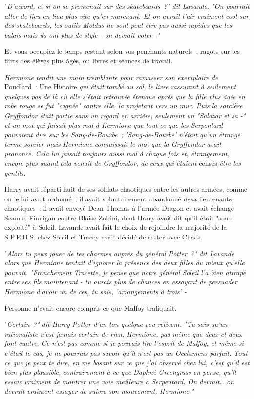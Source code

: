 "\emph{D'accord, et si on se promenait sur des skateboards~?" dit Lavande. "On pourrait aller de lieu en lieu plus vite qu'en marchant. Et on aurait l'air vraiment cool sur des skateboards, les outils Moldus ne sont peut-être pas aussi rapides que les balais mais ils ont plus de style - on devrait voter -"}

Et vous occupiez le temps restant selon vos penchants naturels~: ragots sur les flirts des élèves plus âgés, ou livres et séances de travail.

\emph{Hermione tendit une main tremblante pour ramasser son exemplaire de} Poudlard~: Une Histoire \emph{qui était tombé au sol, le livre rassurant à seulement quelques pas de là où elle s'était retrouvée étendue après que la fille plus âgée en robe rouge se fut "cognée" contre elle, la projetant vers un mur. Puis la sorcière Gryffondor était partie sans un regard en arrière, seulement un "Salazar et sa -" et un mot qui faisait plus mal à Hermione que tout ce que les Serpentard pouvaient dire sur les Sang-de-Bourbe~; 'Sang-de-Bourbe' n'était qu'un étrange terme sorcier mais Hermione connaissait le mot que la Gryffondor avait prononcé. Cela lui faisait toujours aussi mal à chaque fois et, étrangement, encore plus quand cela venait de Gryffondor, de ceux qui étaient} censés \emph{être les gentils.}

Harry avait réparti huit de ses soldats chaotiques entre les autres armées, comme on le lui avait ordonné~; il avait volontairement abandonné \emph{deux} lieutenants chaotiques~: il avait envoyé Dean Thomas à l'armée Dragon et avait échangé Seamus Finnigan contre Blaise Zabini, dont Harry avait dit qu'il était "sous-exploité" à Soleil. Lavande avait fait le choix de rejoindre la majorité de la S.P.E.H.S. chez Soleil et Tracey avait décidé de rester avec Chaos.

"\emph{Alors tu peux jouer de tes charmes auprès du général Potter~?" dit Lavande alors que Hermione tentait d'ignorer la présence des deux filles du mieux qu'elle pouvait. "Franchement Tracette, je pense que notre général Soleil l'a bien attrapé entre ses fils maintenant - tu aurais plus de chances en essayant de persuader Hermione d'avoir un de ces, tu sais, 'arrangements à trois' -}

Personne n'avait encore compris ce que Malfoy trafiquait.

"\emph{Certain~?" dit Harry Potter d'un ton quelque peu réticent. "Tu sais qu'un rationaliste n'est jamais certain de rien, Hermione, pas même que deux et deux font quatre. Ce n'est pas comme si je pouvais lire l'esprit de Malfoy, et même si c'était le cas, je ne pourrais pas savoir qu'il n'est pas un Occlumens parfait. Tout ce que je peux te dire, en me basant sur ce que j'ai observé chez lui, c'est qu'il est bien plus plausible, contrairement à ce que Daphné Greengrass en pense, qu'il essaie vraiment de montrer une voie meilleure à Serpentard. On devrait… on devrait vraiment essayer de suivre son mouvement, Hermione."}


